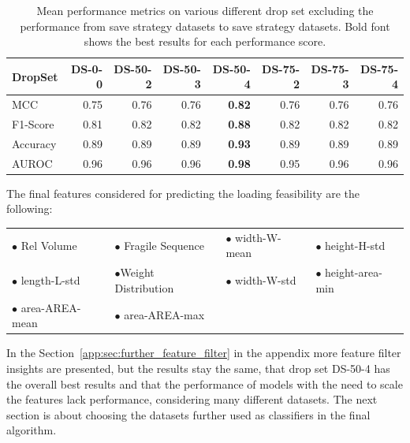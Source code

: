 \begin{table}[ht]
    \centering
    \small
    \begin{tabular}{lrrrrrrr}
        \toprule
        DropSet  & DS-0-0 & DS-50-2 & DS-50-3 & DS-50-4       & DS-75-2 & DS-75-3 & DS-75-4 \\
        \midrule
        MCC      & 0.75   & 0.76    & 0.76    & \textbf{0.82} & 0.76    & 0.76    & 0.76    \\
        F1-Score & 0.81   & 0.82    & 0.82    & \textbf{0.88} & 0.82    & 0.82    & 0.82    \\
        Accuracy & 0.89   & 0.89    & 0.89    & \textbf{0.93} & 0.89    & 0.89    & 0.89    \\
        AUROC    & 0.96   & 0.96    & 0.96    & \textbf{0.98} & 0.95    & 0.96    & 0.96    \\
        \bottomrule
    \end{tabular}
    \caption[Mean performance metrics on various different drop set excluding the performance from save strategy datasets to save strategy datasets.]
    {Mean performance metrics on various different drop set excluding the performance from save strategy datasets to save strategy datasets.
        Bold font shows the best results for each performance score.}
    \label{tab:featurePerformance_Alldata}
\end{table}

The final features considered for predicting the loading feasibility are the following:
\begin{table}[ht]
    \centering
    \def\arraystretch{1.5}
    \begin{tabular}{l l l l }
        $\bullet$ Rel Volume     & $\bullet$ Fragile Sequence   & $\bullet$ width-W-mean & $\bullet$ height-H-std    \\
        $\bullet$ length-L-std   & $\bullet$Weight Distribution & $\bullet$ width-W-std  & $\bullet$ height-area-min \\
        $\bullet$ area-AREA-mean & $\bullet$ area-AREA-max      &                        &                           \\
    \end{tabular}
\end{table}

In the Section~\ref{app:sec:further_feature_filter} in the appendix more feature filter insights are presented, but the
results stay the same, that drop set DS-50-4 has the overall best results and that the performance of models with the need
to scale the features lack performance, considering many different datasets. The next section is about choosing the
datasets further used as classifiers in the final algorithm.


